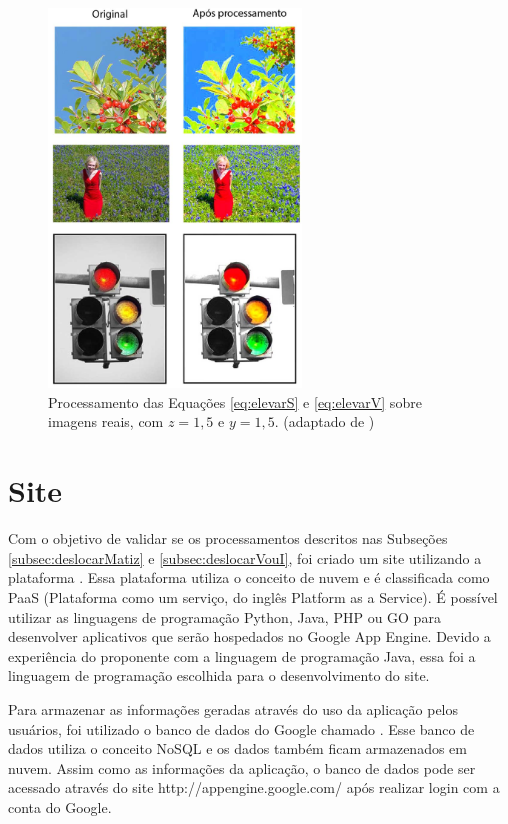 \documentclass[	12pt, Times, openright, twoside, a4paper, english, brazil]{abntex2}
\begin{document}
\begin{figure}[!htb]
\centering \includegraphics[width=0.60\textwidth]{figuraRealSeV15.jpg}
\caption{Processamento das Equações \ref{eq:elevarS} e \ref{eq:elevarV} sobre imagens reais, com $z = 1,5$ e $y = 1,5$. (adaptado de ) \label{fig:figuraRealVeS}}
\end{figure}

\section{Site}

Com o objetivo de validar se os processamentos descritos nas Subseções \ref{subsec:deslocarMatiz} e \ref{subsec:deslocarVouI}, foi criado um site utilizando a plataforma . Essa plataforma utiliza o conceito de nuvem e é classificada como PaaS (Plataforma como um serviço, do inglês Platform as a Service). É possível utilizar as linguagens de programação Python, Java, PHP ou GO para desenvolver aplicativos que serão hospedados no Google App Engine. Devido a experiência do proponente com a linguagem de programação Java, essa foi a linguagem de programação escolhida para o desenvolvimento do site. 

Para armazenar as informações geradas através do uso da aplicação pelos usuários, foi utilizado o banco de dados do Google chamado . Esse banco de dados utiliza o conceito NoSQL e os dados também ficam armazenados em nuvem. Assim como as informações da aplicação, o banco de dados pode ser acessado através do site http://appengine.google.com/ após realizar login com a conta do Google.
\end{document}
